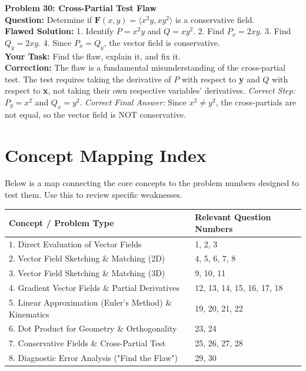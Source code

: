 \documentclass[11pt]{article}
\begin{document}
\vspace{0.3cm}
\textbf{Problem 30: Cross-Partial Test Flaw} \\
\textbf{Question:} Determine if $\mathbf{F}(x,y) = \langle x^2 y, x y^2 \rangle$ is a conservative field. \\
\textbf{Flawed Solution:}
1. Identify $P = x^2 y$ and $Q = x y^2$.
2. Find $P_x = 2xy$.
3. Find $Q_y = 2xy$.
4. Since $P_x = Q_y$, the vector field is conservative. \\
\textbf{Your Task:} Find the flaw, explain it, and fix it. \\
\textbf{Correction:}
The flaw is a fundamental misunderstanding of the cross-partial test. The test requires taking the derivative of $P$ with respect to \textbf{y} and $Q$ with respect to \textbf{x}, not taking their own respective variables' derivatives.
\textit{Correct Step:} $P_y = x^2$ and $Q_x = y^2$. 
\textit{Correct Final Answer:} Since $x^2 \neq y^2$, the cross-partials are not equal, so the vector field is NOT conservative.

\newpage
\section*{Concept Mapping Index}
Below is a map connecting the core concepts to the problem numbers designed to test them. Use this to review specific weaknesses.

\begin{table}[ht]
\centering
\begin{tabular}{@{}ll@{}}
\toprule
\textbf{Concept / Problem Type} & \textbf{Relevant Question Numbers} \\ \midrule
1. Direct Evaluation of Vector Fields & 1, 2, 3 \\
2. Vector Field Sketching \& Matching (2D) & 4, 5, 6, 7, 8 \\
3. Vector Field Sketching \& Matching (3D) & 9, 10, 11 \\
4. Gradient Vector Fields \& Partial Derivatives & 12, 13, 14, 15, 16, 17, 18 \\
5. Linear Approximation (Euler's Method) \& Kinematics & 19, 20, 21, 22 \\
6. Dot Product for Geometry \& Orthogonality & 23, 24 \\
7. Conservative Fields \& Cross-Partial Test & 25, 26, 27, 28 \\
8. Diagnostic Error Analysis ("Find the Flaw") & 29, 30 \\ \bottomrule
\end{tabular}
\end{table}
\end{document}
